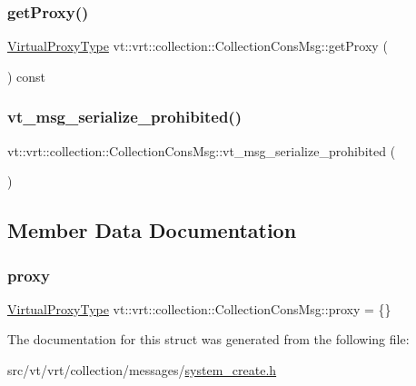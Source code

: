 \subsubsection{\texorpdfstring{get\+Proxy()}{getProxy()}}
{\footnotesize\ttfamily \hyperlink{namespacevt_a1b417dd5d684f045bb58a0ede70045ac}{Virtual\+Proxy\+Type} vt\+::vrt\+::collection\+::\+Collection\+Cons\+Msg\+::get\+Proxy (\begin{DoxyParamCaption}{ }\end{DoxyParamCaption}) const\hspace{0.3cm}{\ttfamily [inline]}}

\mbox{\label{structvt_1_1vrt_1_1collection_1_1_collection_cons_msg_a03c2ecf64adf5d122d672aad462568e8}} 
\subsubsection{\texorpdfstring{vt\+\_\+msg\+\_\+serialize\+\_\+prohibited()}{vt\_msg\_serialize\_prohibited()}}
{\footnotesize\ttfamily vt\+::vrt\+::collection\+::\+Collection\+Cons\+Msg\+::vt\+\_\+msg\+\_\+serialize\+\_\+prohibited (\begin{DoxyParamCaption}{ }\end{DoxyParamCaption})}



\subsection{Member Data Documentation}
\mbox{\label{structvt_1_1vrt_1_1collection_1_1_collection_cons_msg_aa059f3f1cab01c7858b13752eae287d5}} 
\subsubsection{\texorpdfstring{proxy}{proxy}}
{\footnotesize\ttfamily \hyperlink{namespacevt_a1b417dd5d684f045bb58a0ede70045ac}{Virtual\+Proxy\+Type} vt\+::vrt\+::collection\+::\+Collection\+Cons\+Msg\+::proxy = \{\}}



The documentation for this struct was generated from the following file\+:\begin{DoxyCompactItemize}
\item 
src/vt/vrt/collection/messages/\hyperlink{system__create_8h}{system\+\_\+create.\+h}\end{DoxyCompactItemize}
